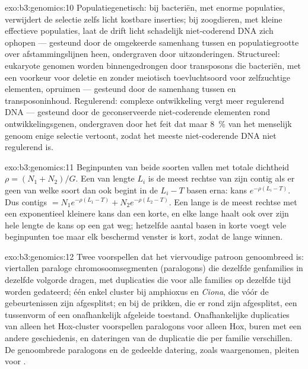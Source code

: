 \begin{solution}{exo:b3:genomics:10}
Populatiegenetisch: bij bacteriën, met enorme populaties, verwijdert de
selectie zelfs licht kostbare inserties; bij zoogdieren, met kleine
effectieve populaties, laat de drift licht schadelijk niet-coderend DNA
zich ophopen --- gesteund door de omgekeerde samenhang tussen
 en populatiegrootte over afstammingslijnen heen,
ondergraven door uitzonderingen. Structureel: eukaryote genomen worden
binnengedrongen door transposons die bacteriën, met een voorkeur voor
deletie en zonder meiotisch toevluchtsoord voor zelfzuchtige elementen,
opruimen --- gesteund door de samenhang tussen  en
transposoninhoud. Regulerend: complexe ontwikkeling vergt meer
regulerend DNA --- gesteund door de geconserveerde niet-coderende
elementen rond ontwikkelingsgenen, ondergraven door het feit dat maar
\qty{8}{\%} van het menselijk genoom enige selectie vertoont, zodat het
meeste niet-coderende DNA niet regulerend is.
\end{solution}

\begin{solution}{exo:b3:genomics:11}
Beginpunten van beide soorten vallen met totale dichtheid $\rho = (N_{1} +
N_{2})/G$. Een  van lengte $L_{i}$ is de meest rechtse van zijn
contig als er geen  van welke soort dan ook begint in de
$L_{i} - T$ basen erna: kans $e^{-\rho(L_{i} - T)}$. Dus contigs $= N_{1}
e^{-\rho(L_{1} - T)} + N_{2} e^{-\rho(L_{2} - T)}$. Een lange  is de
meest rechtse met een exponentieel kleinere kans dan een korte, en elke
lange  haalt ook over zijn hele lengte de kans op een gat weg;
hetzelfde aantal basen in korte  voegt vele beginpunten toe maar
elk beschermd venster is kort, zodat de lange  winnen.
\end{solution}

\begin{solution}{exo:b3:genomics:12}
Twee  voorspellen dat het viervoudige patroon
genoombreed is: viertallen paraloge chromosoomsegmenten (paralogons)
die dezelfde genfamilies in dezelfde volgorde dragen, met duplicaties
die voor alle families op dezelfde tijd worden gedateerd; één enkel
cluster bij amphioxus en \emph{Ciona}, die vóór de gebeurtenissen zijn
afgesplitst; en bij de prikken, die er rond zijn afgesplitst, een
tussenvorm of een onafhankelijk afgeleide toestand. Onafhankelijke
duplicaties van alleen het Hox-cluster voorspellen paralogons voor
alleen Hox, buren met een andere geschiedenis, en dateringen van de
duplicatie die per familie verschillen. De genoombrede paralogons en de
gedeelde datering, zoals waargenomen, pleiten voor
.
\end{solution}

